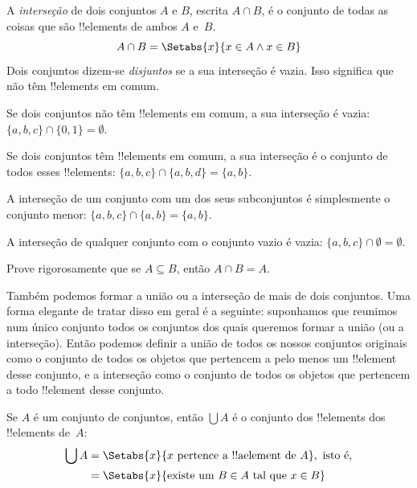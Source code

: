 \documentclass[../../../include/open-logic-section]{subfiles}
\begin{document}
\begin{defn}[Interseção]
A \emph{interseção} de dois conjuntos $A$ e $B$, escrita $A \cap B$, é
o conjunto de todas as coisas que são !!{element}s de ambos $A$ e~$B$.
\[
A \cap B = \Setabs{x}{x \in A \land x \in B}
\]
Dois conjuntos dizem-se \emph{disjuntos} se a sua interseção é
vazia. Isso significa que não têm !!{element}s em comum.
\end{defn}

\begin{ex}
Se dois conjuntos não têm !!{element}s em comum, a sua interseção é vazia:
$\{ a, b, c\} \cap \{ 0, 1\} = \emptyset$.

Se dois conjuntos têm !!{element}s em comum, a sua interseção é o conjunto de
todos esses !!{element}s: $\{a, b, c \} \cap \{a, b, d \} = \{a, b\}$.

A interseção de um conjunto com um dos seus subconjuntos é simplesmente o conjunto menor:
$\{a, b, c\} \cap \{a, b\} = \{a, b\}$.

A interseção de qualquer conjunto com o conjunto vazio é vazia: $\{a, b, c \}
\cap \emptyset = \emptyset$.
\end{ex}

\begin{prob}
Prove rigorosamente que se $A \subseteq B$, então $A \cap B = A$.
\end{prob}

\begin{explain}
Também podemos formar a união ou a interseção de mais de dois
conjuntos. Uma forma elegante de tratar disso em geral é a
seguinte: suponhamos que reunimos num único conjunto todos os conjuntos dos quais queremos formar a união
(ou a interseção). Então podemos definir a união
de todos os nossos conjuntos originais como o conjunto de todos os objetos que pertencem a pelo
menos um !!{element} desse conjunto, e a interseção como o conjunto de
todos os objetos que pertencem a todo !!{element} desse conjunto.
\end{explain}

\begin{defn}
Se $A$ é um conjunto de conjuntos, então $\bigcup A$ é o conjunto dos !!{element}s dos
!!{element}s de~$A$:
\begin{align*}
\bigcup A & = \Setabs{x}{x \text{ pertence a !!a{element} de } A},
\text{ isto é,}\\
& = \Setabs{x}{\text{existe um } B \in A
  \text{ tal que } x \in B}
\end{align*}
\end{defn}
\end{document}
